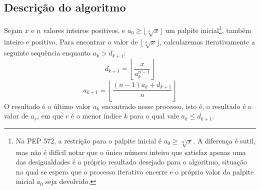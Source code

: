 \subsection*{Descrição do algoritmo}

Sejam $x$ e $n$ valores inteiros positivos,
e $a_0 \ge \lfloor \sqrt[n]{x} \rfloor$ um palpite inicial\footnote{
  Na PEP 572,
  a restrição para o palpite inicial é $a_0 \ge \sqrt[n]{x}$.
  A diferença é sutil, mas não é difícil notar
  que o único número inteiro que satisfaz apenas uma das desigualdades
  é o próprio resultado desejado para o algoritmo,
  situação na qual se espera que o processo iterativo encerre
  e o próprio valor do palpite inicial $a_0$ seja devolvido.
},
também inteiro e positivo.
Para encontrar o valor de $\lfloor \sqrt[n]{x} \rfloor$,
calcularemos iterativamente a seguinte sequência
enquanto $a_k > d_{k+1}$:
\[
  d_{k+1} = \left\lfloor \dfrac{x}{a_k^{n-1}} \right\rfloor
\]
\[
  a_{k+1} = \left\lfloor \dfrac{(n-1) a_k + d_{k+1}}{n} \right\rfloor
\]
O resultado é o último valor $a_k$ encontrado nesse processo,
isto é, o resultado é o valor de $a_r$,
em que $r$ é o menor índice $k$ para o qual vale $a_k \le d_{k+1}$.
